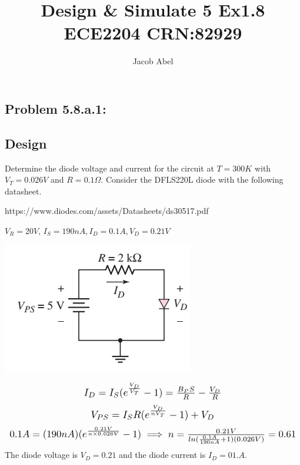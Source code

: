 \documentclass[12pt,letterpaper,titlepage]{article}
\author{Jacob Abel}
\title{	Design \& Simulate 5 Ex1.8
	\\\large ECE2204 CRN:82929
}
\begin{document}
\maketitle
\begin{raggedright}

\section{Problem 5.8.a.1: }
\subsection{Design}

Determine the diode voltage and current for the circuit at $T = 300K$ with $V_T = 0.026V$ and $R = 0.1\Omega$. Consider the DFLS220L diode with the following datasheet. 

https://www.diodes.com/assets/Datasheets/ds30517.pdf

$V_R = 20V$, $I_S = 190nA, I_D=0.1A, V_D=0.21V$
\begin{center}
\includegraphics[width=\textwidth, height=9\baselineskip, keepaspectratio=true]{ds1}
\end{center}
\begin{equation}\scalebox{1.25}{
$
I_D = I_S (e^{\frac{V_D}{V_T}} - 1) = \frac{B_PS}{R} - \frac{V_D}{R}
$
}
\end{equation}
\begin{equation}\scalebox{1.25}{
$
V_{PS} = I_SR(e^{\frac{V_D}{nV_T}} - 1)+V_D
$
}
\end{equation}
\begin{equation}\scalebox{1.25}{
$
0.1A = (190nA)(e^{\frac{0.21V}{n\times 0.026V}} - 1) \implies n = \frac{0.21V}{ln(\frac{0.1A}{190nA}+1)(0.026V)} = 0.61
$
}
\end{equation}
The diode voltage is $V_D = 0.21$ and the diode current is $I_D=01.A$.
	

\end{raggedright}
\end{document}
